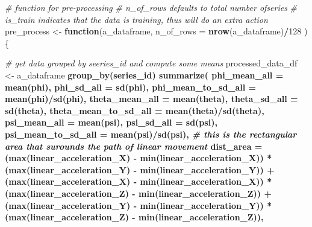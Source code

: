 \documentclass[]{article}
\newenvironment{Shaded}{\begin{snugshade}}{\end{snugshade}}
\newcommand{\CommentTok}[1]{\textcolor[rgb]{0.56,0.35,0.01}{\textit{#1}}}
\newcommand{\ControlFlowTok}[1]{\textcolor[rgb]{0.13,0.29,0.53}{\textbf{#1}}}
\newcommand{\DataTypeTok}[1]{\textcolor[rgb]{0.13,0.29,0.53}{#1}}
\newcommand{\DecValTok}[1]{\textcolor[rgb]{0.00,0.00,0.81}{#1}}
\newcommand{\KeywordTok}[1]{\textcolor[rgb]{0.13,0.29,0.53}{\textbf{#1}}}
\newcommand{\NormalTok}[1]{#1}
\newcommand{\OperatorTok}[1]{\textcolor[rgb]{0.81,0.36,0.00}{\textbf{#1}}}
\newcommand{\StringTok}[1]{\textcolor[rgb]{0.31,0.60,0.02}{#1}}
\begin{document}
\begin{Shaded}
\begin{Highlighting}[]
\CommentTok{# function for pre-processing }
\CommentTok{# n_of_rows defaults to total number ofseries}
\CommentTok{# is_train indicates that the data is training, thus will do an extra action}
\NormalTok{pre_process <-}\StringTok{ }\ControlFlowTok{function}\NormalTok{(a_dataframe, }\DataTypeTok{n_of_rows =} \KeywordTok{nrow}\NormalTok{(a_dataframe)}\OperatorTok{/}\DecValTok{128}\NormalTok{ ) \{}
    
    \CommentTok{# get data grouped by seeries_id and compute some means }
\NormalTok{    processed_data_df <-}\StringTok{ }\NormalTok{a_dataframe }\OperatorTok{%
\StringTok{    }\KeywordTok{group_by}\NormalTok{(series_id) }\OperatorTok{%
\StringTok{    }\KeywordTok{summarize}\NormalTok{(}
        \DataTypeTok{phi_mean_all =} \KeywordTok{mean}\NormalTok{(phi),}
        \DataTypeTok{phi_sd_all =} \KeywordTok{sd}\NormalTok{(phi),}
        \DataTypeTok{phi_mean_to_sd_all =} \KeywordTok{mean}\NormalTok{(phi)}\OperatorTok{/}\KeywordTok{sd}\NormalTok{(phi),}
        \DataTypeTok{theta_mean_all =} \KeywordTok{mean}\NormalTok{(theta),}
        \DataTypeTok{theta_sd_all =} \KeywordTok{sd}\NormalTok{(theta),}
        \DataTypeTok{theta_mean_to_sd_all =} \KeywordTok{mean}\NormalTok{(theta)}\OperatorTok{/}\KeywordTok{sd}\NormalTok{(theta),}
        \DataTypeTok{psi_mean_all =} \KeywordTok{mean}\NormalTok{(psi),}
        \DataTypeTok{psi_sd_all =} \KeywordTok{sd}\NormalTok{(psi),}
        \DataTypeTok{psi_mean_to_sd_all =} \KeywordTok{mean}\NormalTok{(psi)}\OperatorTok{/}\KeywordTok{sd}\NormalTok{(psi),}
        \CommentTok{# this is the rectangular area that surounds the path of linear movement}
        \DataTypeTok{dist_area =}\NormalTok{ (}\KeywordTok{max}\NormalTok{(linear_acceleration_X) }\OperatorTok{-}\StringTok{ }\KeywordTok{min}\NormalTok{(linear_acceleration_X)) }\OperatorTok{*}\StringTok{ }\NormalTok{(}\KeywordTok{max}\NormalTok{(linear_acceleration_Y) }\OperatorTok{-}\StringTok{ }\KeywordTok{min}\NormalTok{(linear_acceleration_Y)) }\OperatorTok{+}\StringTok{ }
\StringTok{            }\NormalTok{(}\KeywordTok{max}\NormalTok{(linear_acceleration_X) }\OperatorTok{-}\StringTok{ }\KeywordTok{min}\NormalTok{(linear_acceleration_X)) }\OperatorTok{*}\StringTok{ }\NormalTok{(}\KeywordTok{max}\NormalTok{(linear_acceleration_Z) }\OperatorTok{-}\StringTok{ }\KeywordTok{min}\NormalTok{(linear_acceleration_Z)) }\OperatorTok{+}\StringTok{ }
\StringTok{            }\NormalTok{(}\KeywordTok{max}\NormalTok{(linear_acceleration_Y) }\OperatorTok{-}\StringTok{ }\KeywordTok{min}\NormalTok{(linear_acceleration_Y)) }\OperatorTok{*}\StringTok{ }\NormalTok{(}\KeywordTok{max}\NormalTok{(linear_acceleration_Z) }\OperatorTok{-}\StringTok{ }\KeywordTok{min}\NormalTok{(linear_acceleration_Z)),}
}}
\end{Highlighting}
\end{Shaded}
\end{document}
